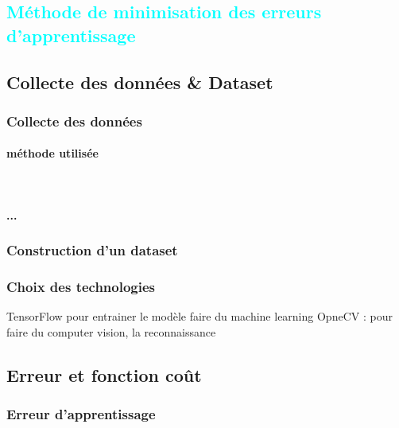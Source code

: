 			


%
%



\textcolor{cyan}{\chapter{Méthode de minimisation des erreurs d'apprentissage}}	
	\section{Collecte des données \& Dataset }
	
	\subsection*{Collecte des données}
	\lipsum[1]
	\lipsum[2]
	\subsubsection{méthode utilisée}
	\lipsum[1]\\
	
	\subsubsection{...}
	\lipsum[1]
	\subsection*{Construction d'un dataset}
	\lipsum[1]
	\subsection*{Choix des technologies}
	\lipsum[1]
	TensorFlow pour entrainer le modèle faire du machine learning
	OpneCV : pour faire du computer vision, la reconnaissance 

	\section{Erreur et fonction coût}
	\lipsum[1]
	\subsection{Erreur d'apprentissage}
	\lipsum[1]
	
